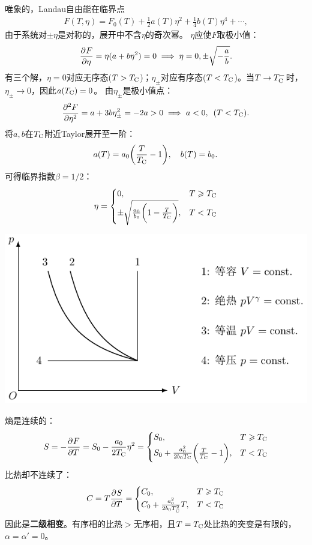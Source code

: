 唯象的，Landau自由能在临界点
\begin{align}
	F(T,\eta)=F_0(T)+\frac12a(T)\eta^2+\frac14b(T)\eta^4+\cdots,
\end{align}
由于系统对$\pm\eta$是对称的，展开中不含$\eta$的奇次幂。
$\eta$应使$F$取极小值：
\[
	\pv F\eta=\eta(a+b\eta^2)=0
	\implies\eta=0,\pm\sqrt{-\frac ab}.
\]
有三个解，$\eta=0$对应无序态($T>T_\crt$)；$\eta_\pm$对应有序态($T<T_\crt$)。当$T\to T_\crt^-$时，$\eta_\pm\to 0$，因此$a(T_\crt)=0$。
由$\eta_\pm$是极小值点：
\[
	\pv[2]F\eta=a+3b\eta_\pm^2=-2a>0
	\implies a<0,\enspace (T<T_\crt).
\]
将$a,b$在$T_\crt$附近Taylor展开至一阶：
\[
	a(T)=a_0\biggkh{\frac T{T_\crt}-1},\quad b(T)=b_0.
\]
可得临界指数$\beta=1/2$：
\begin{equation}
	\eta=
	\begin{cases}
		0,&T\geqslant T_\crt\\
		\pm\sqrt{\frac{a_0}{b_0}\biggkh{1-\frac T{T_\crt}}},&T<T_\crt
	\end{cases}
\end{equation}
\begin{center}
	\includegraphics[page=26]{figures/tikz/coordinates.pdf}
	\label{fig:Landau free energy}
\end{center}
熵是连续的：
\begin{equation}
	S=-\pv FT=S_0-\frac{a_0}{2T_\crt}\eta^2=
	\begin{cases}
		S_0,                             & T\geqslant T_\crt \\
		S_0+\frac{a_0^2}{2b_0T_\crt}\biggkh{\frac T{T_\crt}-1}, & T<T_\crt
	\end{cases}
\end{equation}
比热却不连续了：
\begin{equation}
	C=T\pv ST=
	\begin{cases}
		C_0,                 & T\geqslant T_\crt \\
		C_0+\frac{a_0^2}{2b_0T_\crt^2}T, & T<T_\crt
	\end{cases}
\end{equation}
因此是\textbf{二级相变}。有序相的比热$>$无序相，且$T=T_\crt$处比热的突变是有限的，$\alpha=\alpha'=0$。

